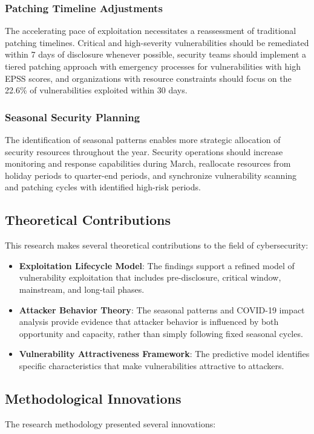 \documentclass[runningheads]{llncs}
\begin{document}
\subsubsection{Patching Timeline Adjustments}
The accelerating pace of exploitation necessitates a reassessment of traditional patching timelines. Critical and high-severity vulnerabilities should be remediated within 7 days of disclosure whenever possible, security teams should implement a tiered patching approach with emergency processes for vulnerabilities with high EPSS scores, and organizations with resource constraints should focus on the 22.6\% of vulnerabilities exploited within 30 days.

\subsubsection{Seasonal Security Planning}
The identification of seasonal patterns enables more strategic allocation of security resources throughout the year. Security operations should increase monitoring and response capabilities during March, reallocate resources from holiday periods to quarter-end periods, and synchronize vulnerability scanning and patching cycles with identified high-risk periods.

\subsection{Theoretical Contributions}
This research makes several theoretical contributions to the field of cybersecurity:

\begin{itemize}
    \item \textbf{Exploitation Lifecycle Model}: The findings support a refined model of vulnerability exploitation that includes pre-disclosure, critical window, mainstream, and long-tail phases.
    
    \item \textbf{Attacker Behavior Theory}: The seasonal patterns and COVID-19 impact analysis provide evidence that attacker behavior is influenced by both opportunity and capacity, rather than simply following fixed seasonal cycles.
    
    \item \textbf{Vulnerability Attractiveness Framework}: The predictive model identifies specific characteristics that make vulnerabilities attractive to attackers.
\end{itemize}

\subsection{Methodological Innovations}
The research methodology presented several innovations:
\end{document}
